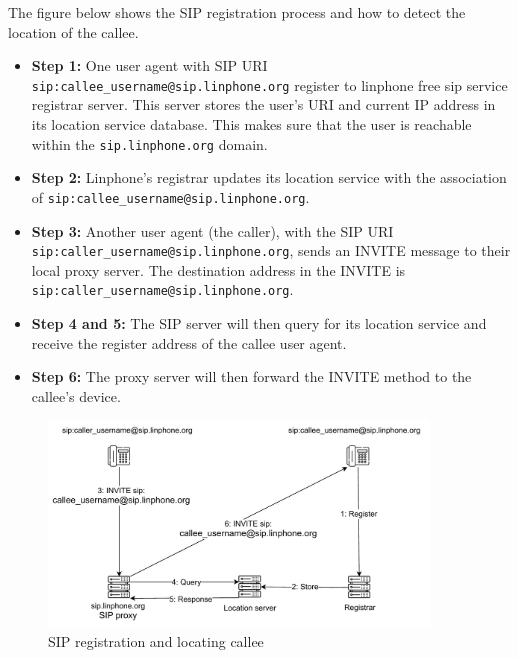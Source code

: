     \noindent The figure below shows the SIP registration process and how to detect the location of the callee. 
    
    \begin{itemize}
        \item \textbf {Step 1:} One user agent with SIP URI \texttt{sip:callee\_username@sip.linphone.org} register to linphone free sip service registrar server. 
        This server stores the user’s URI and current IP address in its location service database. 
        This makes sure that the user is reachable within the \texttt{sip.linphone.org} domain. 
        \item \textbf {Step 2:} Linphone’s registrar updates its location service with the association of \texttt{sip:\allowbreak callee\_username@sip.linphone.org}.
        \item \textbf {Step 3:} Another user agent (the caller), with the SIP URI \texttt{\allowbreak sip:caller\_username\allowbreak @sip.linphone.org}, 
        sends an INVITE message to their local proxy server. 
        The destination address in the INVITE is \texttt{sip:caller\_username@sip.linphone.org}.
        \item \textbf {Step 4 and 5:} The SIP server will then query for its location service and receive the register address of the callee user agent.
        \item \textbf {Step 6:} The proxy server will then forward the INVITE method to the callee’s device. 
    \end{itemize}

    \begin{figure}[H]
        \centering
        \includegraphics[width=0.9\textwidth, height=0.4\textheight]{image/Locating_callee.pdf} 
        \caption{SIP registration and locating callee}
        \label{fig:locating_callee}
    \end{figure}

